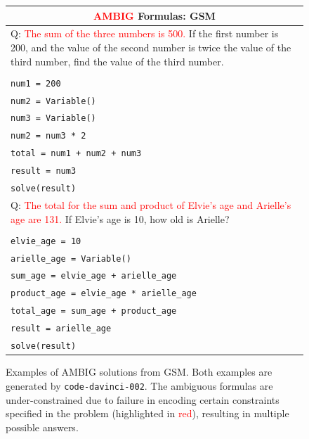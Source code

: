 \documentclass{article}
\theoremstyle{definition}
\newcommand\ttsmall[1]{\texttt{\small #1}}
\newcommand{\gsm}{\textsc{GSM}}
\begin{document}
\begin{figure}[h]
    \footnotesize
    \centering
    \begin{tabularx}{\linewidth}{X}
    \toprule
        \multicolumn{1}{c}{\bf \textcolor{red}{AMBIG} Formulas: \gsm{}} \\
         \midrule

    Q: \textcolor{red}{The sum of the three numbers is 500.} If the first number is 200, and the value of the second number is twice the value of the third number, find the value of the third number. \\
    \\
   \tt num1 = 200 \\
    \tt    num2 = Variable() \\
    \tt    num3 = Variable()\\
     \tt   num2 = num3 * 2 \\
      \tt  total = num1 + num2 + num3\\
      \tt  result = num3 \\
      \tt  solve(result) \\

    \midrule
Q: \textcolor{red}{The total for the sum and product of Elvie's age and Arielle's age are 131. } If Elvie's age is 10, how old is Arielle?
\\
\\
  \tt  elvie\_age = 10\\
   \tt arielle\_age = Variable()\\
   \tt sum\_age = elvie\_age + arielle\_age\\
 \tt   product\_age = elvie\_age * arielle\_age\\
  \tt  total\_age = sum\_age + product\_age\\
  \tt  result = arielle\_age\\
   \tt solve(result)\\
    \bottomrule
    \end{tabularx}
    \caption{ Examples of AMBIG solutions from \gsm{}. Both examples are generated by \ttsmall{code-davinci-002}. The ambiguous  formulas are under-constrained due to failure in encoding certain constraints specified in the problem (highlighted in \textcolor{red}{red}), resulting in multiple possible answers.}
    \label{fig:ambig_exs_gsm}
\end{figure}

\newpage
\end{document}
